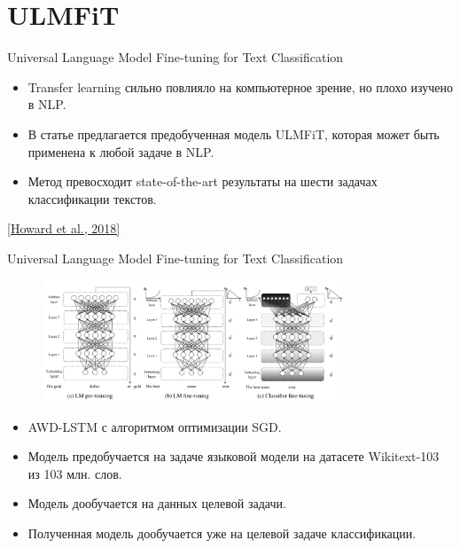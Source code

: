 \section{ULMFiT}
\begin{frame}[c]{Universal Language Model Fine-tuning for Text Classification}
\begin{itemize}
	[square]
	\item Transfer learning сильно повлияло на компьютерное зрение, но плохо изучено в NLP.
	\item В статье предлагается предобученная модель ULMFiT, которая может быть применена к любой задаче в NLP.
	\item Метод превосходит state-of-the-art результаты на шести задачах классификации текстов.
\end{itemize}
\let\thefootnote\footnote{\href{https://arxiv.org/abs/1801.06146}{\color[rgb]{0.5,0.5,0.5} [Howard et al., 2018]}}
\end{frame}

\begin{frame}[c]{Universal Language Model Fine-tuning for Text Classification}
\begin{figure}
	\centering
	\includegraphics[width=0.8\textwidth]{figures/ulmfit.png}
\end{figure}
\begin{itemize}
	[square]
	\item AWD-LSTM с алгоритмом оптимизации SGD.
	\item Модель предобучается на задаче языковой модели на датасете Wikitext-103 из 103 млн. слов.
	\item Модель дообучается на данных целевой задачи.
	\item Полученная модель дообучается уже на целевой задаче классификации.
\end{itemize}
\end{frame}

